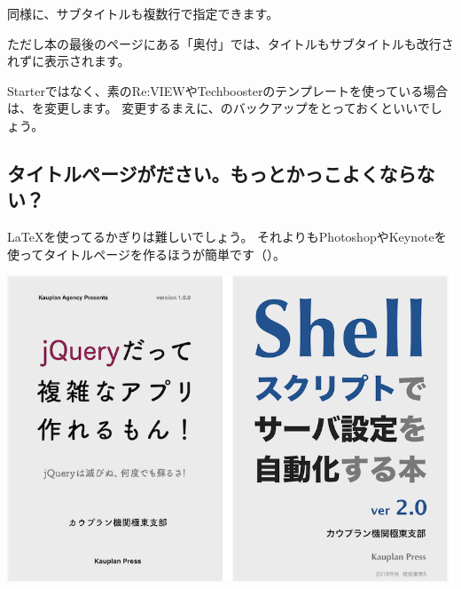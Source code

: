 同様に、サブタイトルも複数行で指定できます。

ただし本の最後のページにある「奥付」では、タイトルもサブタイトルも改行されずに表示されます。

Starterではなく、素のRe:VIEWやTechboosterのテンプレートを使っている場合は、を変更します。
変更するまえに、のバックアップをとっておくといいでしょう。

\label{}
\begin{starterprogram}\end{starterprogram}

\subsection*{タイトルぺージがださい。もっとかっこよくならない？}
\label{sec:2-6-2}

\LaTeX{}を使ってるかぎりは難しいでしょう。
それよりもPhotoshopやKeynoteを使ってタイトルページを作るほうが簡単です（）。

\begin{reviewimage}%
\includegraphics[width=\maxwidth]{./images/chap02-faq/titlepage-samples.png}%
\label{image:chap02-faq:titlepage-samples}
\end{reviewimage}

